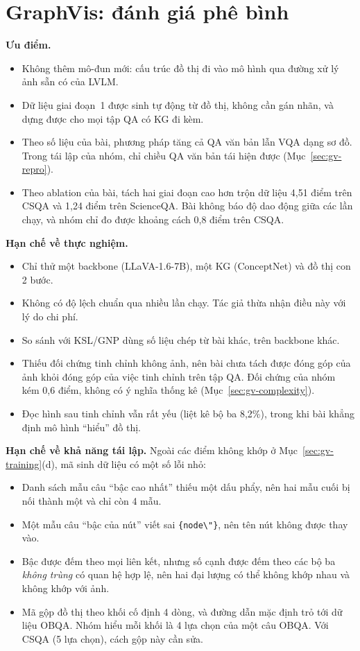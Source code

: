 \section{GraphVis: đánh giá phê bình}\label{sec:gv-critique}
\textbf{Ưu điểm.}
\begin{itemize}
\item Không thêm mô-đun mới: cấu trúc đồ thị đi vào mô hình qua đường xử lý ảnh sẵn có của LVLM.
\item Dữ liệu giai đoạn~1 được sinh tự động từ đồ thị, không cần gán nhãn, và dựng được cho mọi tập QA có KG đi kèm.
\item Theo số liệu của bài, phương pháp tăng cả QA văn bản lẫn VQA dạng sơ đồ. Trong tái lập của nhóm, chỉ chiều QA văn bản tái hiện được (Mục~\ref{sec:gv-repro}).
\item Theo ablation của bài, tách hai giai đoạn cao hơn trộn dữ liệu 4,51 điểm trên CSQA và 1,24 điểm trên ScienceQA. Bài không báo độ dao động giữa các lần chạy, và nhóm chỉ đo được khoảng cách 0,8 điểm trên CSQA.
\end{itemize}

\textbf{Hạn chế về thực nghiệm.}
\begin{itemize}
\item Chỉ thử một backbone (LLaVA-1.6-7B), một KG (ConceptNet) và đồ thị con 2 bước.
\item Không có độ lệch chuẩn qua nhiều lần chạy. Tác giả thừa nhận điều này với lý do chi phí.
\item So sánh với KSL/GNP dùng số liệu chép từ bài khác, trên backbone khác.
\item Thiếu đối chứng tinh chỉnh không ảnh, nên bài chưa tách được đóng góp của ảnh khỏi đóng góp của việc tinh chỉnh trên tập QA. Đối chứng của nhóm kém \GV{} 0,6 điểm, không có ý nghĩa thống kê (Mục~\ref{sec:gv-complexity}).
\item Đọc hình sau tinh chỉnh vẫn rất yếu (liệt kê bộ ba 8,2\%), trong khi bài khẳng định mô hình ``hiểu'' đồ thị.
\end{itemize}

\textbf{Hạn chế về khả năng tái lập.} Ngoài các điểm không khớp ở Mục~\ref{sec:gv-training}(d), mã sinh dữ liệu có một số lỗi nhỏ:
\begin{itemize}
\item Danh sách mẫu câu ``bậc cao nhất'' thiếu một dấu phẩy, nên hai mẫu cuối bị nối thành một và chỉ còn 4 mẫu.
\item Một mẫu câu ``bậc của nút'' viết sai \texttt{\{node\textbackslash"\}}, nên tên nút không được thay vào.
\item Bậc được đếm theo mọi liên kết, nhưng số cạnh được đếm theo các bộ ba \emph{không trùng} có quan hệ hợp lệ, nên hai đại lượng có thể không khớp nhau và không khớp với ảnh.
\item Mã gộp đồ thị theo khối cố định 4 dòng, và đường dẫn mặc định trỏ tới dữ liệu OBQA. Nhóm hiểu mỗi khối là 4 lựa chọn của một câu OBQA. Với CSQA (5 lựa chọn), cách gộp này cần sửa.
\end{itemize}
